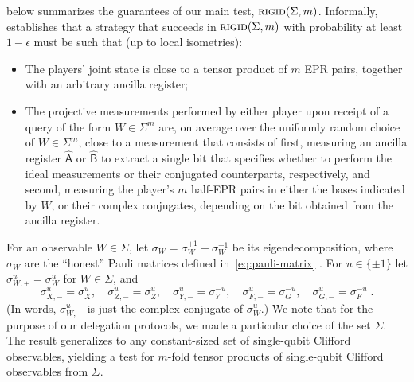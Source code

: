 \documentclass{toc}
\newcommand{\reg}[1]{{\textsf{#1}}}
\newcommand{\rigid}{\textsc{rigid}}
\begin{document}
 below summarizes the guarantees of our main
test,  $\rigid(\Sigma,m)$. Informally,  establishes that a strategy that succeeds in $\rigid(\Sigma,m)$ with probability at least  $1-\epsilon$ must be such that (up to local isometries):
\begin{itemize}
    \item The players' joint state is close to a tensor product of $m$ EPR pairs, together with an arbitrary ancilla register;
    \item The projective measurements performed by either player upon receipt of a query of the form $W\in\Sigma^m$ are, on average over the uniformly random choice of $W\in\Sigma^m$, close to a measurement that consists of first, measuring an ancilla register $\hat{\reg{A}}$ or $\hat{\reg{B}}$
%
to extract a single bit that specifies whether to perform the ideal measurements or their conjugated counterparts, 
respectively, %
and second, measuring the player's $m$ half-EPR pairs in either the bases indicated by $W$, or their complex %
conjugates,  %
depending on the bit obtained from the ancilla register. 
\end{itemize}

For an observable $W\in\Sigma$, let $\sigma_W = \sigma_W^{+1} - \sigma_W^{-1}$ be its eigendecomposition, where $\sigma_W$ are the ``honest'' Pauli matrices defined in~\eqref{eq:pauli-matrix} . For $u\in\{\pm 1\}$ let $\sigma_{W,+}^u = \sigma_W^u$ for $W\in \Sigma$, and 
$$ \sigma_{X,-}^u = \sigma_X^u,\quad\sigma_{Z,-}^u = \sigma_Z^u,\quad\sigma_{Y,-}^u = \sigma_Y^{-u},\quad\sigma_{F,-}^u = \sigma_G^{-u},\quad\sigma_{G,-}^u = \sigma_F^{-u}\;.$$
(In words, $\sigma_{W,-}^u$ is just the complex conjugate of $\sigma_W^u$.) We note that for the purpose of our delegation protocols, we made a particular choice of the set $\Sigma$. The result generalizes to any constant-sized set of single-qubit Clifford observables,  yielding a test for $m$-fold tensor products of single-qubit Clifford observables from $\Sigma$.
\end{document}
